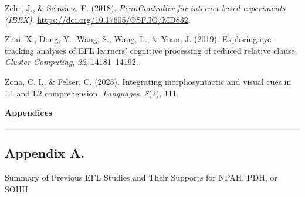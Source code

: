 \documentclass[
]{article}
\newlength{\cslhangindent}
\newenvironment{CSLReferences}[2] %
 {\begin{list}{}{%
  \setlength{\itemindent}{0pt}
  \setlength{\leftmargin}{0pt}
  \setlength{\parsep}{0pt}
  \ifodd #1
   \setlength{\leftmargin}{\cslhangindent}
   \setlength{\itemindent}{-1\cslhangindent}
  \fi
  \setlength{\itemsep}{#2\baselineskip}}}
 {\end{list}}
\begin{document}
\begin{CSLReferences}{1}{0}
Zehr, J., \& Schwarz, F. (2018). \emph{PennController for internet based
experiments (IBEX)}. \url{https://doi.org/10.17605/OSF.IO/MD832}.

Zhai, X., Dong, Y., Wang, S., Wang, L., \& Yuan, J. (2019). Exploring
eye-tracking analyses of EFL learners' cognitive processing of reduced
relative clause. \emph{Cluster Computing}, \emph{22}, 14181--14192.

Zona, C. I., \& Felser, C. (2023). Integrating morphosyntactic and
visual cues in L1 and L2 comprehension. \emph{Languages}, \emph{8}(2),
111.

\end{CSLReferences}

\clearpage
\thispagestyle{empty}  %
\vspace*{-1cm}
\begin{flushleft}
\Huge \textbf{Appendices}
\end{flushleft}
\vspace{0.3cm}
\noindent\rule{\linewidth}{0.6pt}
\pagestyle{fancy}  %

\subsection*{Appendix A.}\label{appendix-a.}

\noindent Summary of Previous EFL Studies and Their Supports for NPAH,
PDH, or SOHH

\vspace{1em}

\renewcommand{\arraystretch}{1.3}\begingroup\fontsize{9}{11}\selectfont
\end{document}
